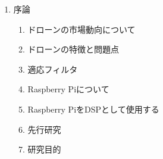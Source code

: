 \documentclass[
]{jsarticle}
\author{}
\date{}
\providecommand{\tightlist}{%
  \setlength{\itemsep}{0pt}\setlength{\parskip}{0pt}}
\begin{document}
\begin{enumerate}
\def\labelenumi{\arabic{enumi}.}
\tightlist
\item
  序論

  \begin{enumerate}
  \def\labelenumii{\arabic{enumii}.}
  \tightlist
  \item
    ドローンの市場動向について
  \item
    ドローンの特徴と問題点
  \item
    適応フィルタ
  \item
    Raspberry Piについて
  \item
    Raspberry PiをDSPとして使用する
  \item
    先行研究
  \item
    研究目的
  \end{enumerate}
\end{enumerate}
\end{document}

